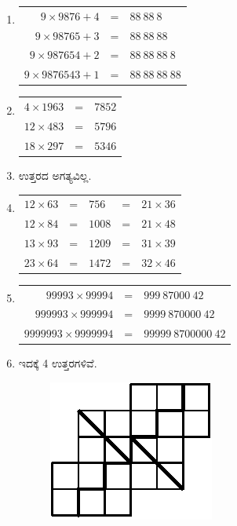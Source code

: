\begin{enumerate}
\item 
\begin{tabular}[t]{rcl}
$9\times 9876 + 4$ & = & $88~88~8$\\
$9\times 98765 + 3$ & = & $88~88~88$\\
$9\times 987654 + 2$ & = & $88~88~88~8$\\
$9\times 9876543 + 1$ & = & $88~88~88~88$
\end{tabular}

\item 
\begin{tabular}[t]{lll}
$4\times 1963$ & = & $7852$\\
$12\times 483$ & = & $5796$\\
$18\times 297$ & = & $5346$
\end{tabular}

\item ಉತ್ತರದ ಅಗತ್ಯವಿಲ್ಲ. 

\item 
\begin{tabular}[t]{lllll}
$12\times 63$ & = & $756$ & = & $21\times 36$\\
$12\times 84$ & = & $1008$ & = & $21\times 48$\\
$13\times 93$ & = & $1209$ & = & $31\times 39$\\
$23\times 64$ & = & $1472$ & = & $32\times 46$
\end{tabular}

\item 
\begin{tabular}[t]{rcl}
$99993\times 99994$ & = & $999~87000~42$\\
$999993\times 999994$ & = & $9999~870000~42$\\
$9999993\times 9999994$ & = & $99999~8700000~42$
\end{tabular}

\item ಇದಕ್ಕೆ 4 ಉತ್ತರಗಳಿವೆ. 
\begin{figure}[H]
\centering
\includegraphics{images/chap11/ans14-1.eps}
\end{figure}


\end{enumerate}
